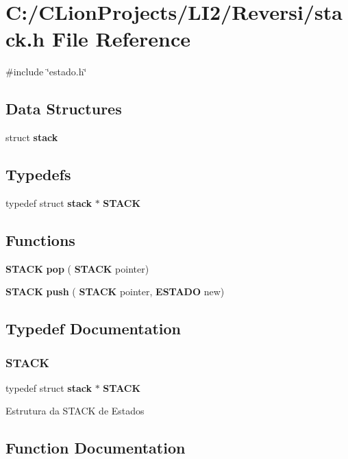 \section{C\+:/\+C\+Lion\+Projects/\+L\+I2/\+Reversi/stack.h File Reference}
\label{stack_8h}
{\ttfamily \#include \char`\"{}estado.\+h\char`\"{}}\newline
\subsection*{Data Structures}
\begin{DoxyCompactItemize}
\item 
struct \textbf{ stack}
\end{DoxyCompactItemize}
\subsection*{Typedefs}
\begin{DoxyCompactItemize}
\item 
typedef struct \textbf{ stack} $\ast$ \textbf{ S\+T\+A\+CK}
\end{DoxyCompactItemize}
\subsection*{Functions}
\begin{DoxyCompactItemize}
\item 
\textbf{ S\+T\+A\+CK} \textbf{ pop} (\textbf{ S\+T\+A\+CK} pointer)
\item 
\textbf{ S\+T\+A\+CK} \textbf{ push} (\textbf{ S\+T\+A\+CK} pointer, \textbf{ E\+S\+T\+A\+DO} new)
\end{DoxyCompactItemize}


\subsection{Typedef Documentation}
\mbox{\label{stack_8h_a0c5fcba25177df04babf184407bd8c27}} 
\subsubsection{STACK}
{\footnotesize\ttfamily typedef struct \textbf{ stack} $\ast$ \textbf{ S\+T\+A\+CK}}

Estrutura da S\+T\+A\+CK de Estados 

\subsection{Function Documentation}
\mbox{\label{stack_8h_af3faabeca2390302dc29d6247269c146}} 
